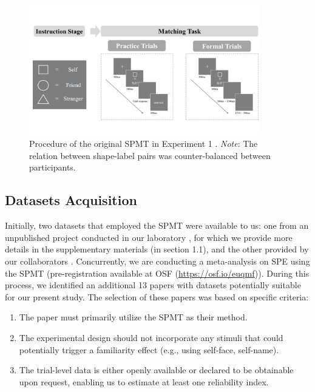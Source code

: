 \documentclass[sn-apa]{sn-jnl}%
\theoremstyle{thmstyleone}%
\theoremstyle{thmstyletwo}%
\theoremstyle{thmstylethree}%
\begin{document}
\begin{figure}[!htbp]
	\centering
	\includegraphics[width=0.9\textwidth]{./Figure/Fig_1_exp_pro.png}
	\caption{Procedure of the original SPMT in Experiment 1 \parencite{sui2012perceptual}. \textit{Note}: The relation between shape-label pairs was counter-balanced between participants.
	}\label{fig:SPMT_procedure}
\end{figure}

\subsection{Datasets Acquisition}\label{subsec:dataset}

Initially, two datasets that employed the SPMT were available to us: one from an unpublished project conducted in our laboratory \parencite{hu2023data}, for which we provide more details in the supplementary materials (in section 1.1), and the other provided by our collaborators \parencite{liu2023to}. Concurrently, we are conducting a meta-analysis on SPE using the SPMT (pre-registration available at OSF (\url{https://osf.io/euqmf})). During this process, we identified an additional 13 papers with datasets potentially suitable for our present study. The selection of these papers was based on specific criteria:

\begin{enumerate}[label=\arabic*)]
	\item The paper must primarily utilize the SPMT as their method.
	\item The experimental design should not incorporate any stimuli that could potentially trigger a familiarity effect (e.g., using self-face, self-name).
	\item The trial-level data is either openly available or declared to be obtainable upon request, enabling us to estimate at least one reliability index.
\end{enumerate}
\end{document}
